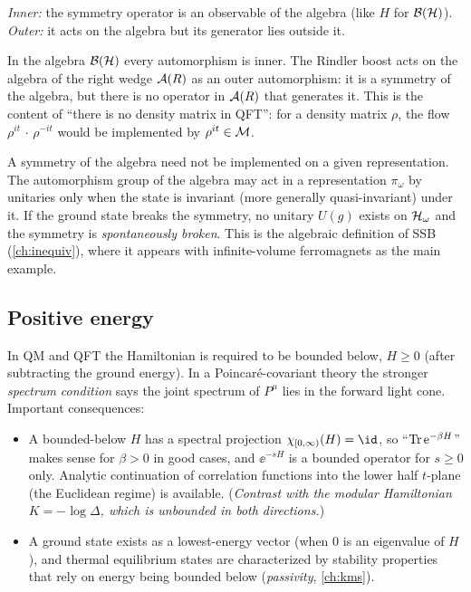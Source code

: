 \begin{center}
\emph{Inner:} the symmetry operator is an observable of the algebra (like $H$ for $\mathcal{B}(\mathcal{H})$).\\
\emph{Outer:} it acts on the algebra but its generator lies outside it.
\end{center}
In the algebra $\mathcal{B}(\mathcal{H})$ every automorphism is inner. The Rindler boost acts on the algebra of the right wedge $\mathcal{A}(R)$ as an outer automorphism: it is a symmetry of the algebra, but there is no operator in $\mathcal{A}(R)$ that generates it. This is the content of ``there is no density matrix in QFT'': for a density matrix $\rho$, the flow $\rho^{it}\,\cdot\,\rho^{-it}$ would be implemented by $\rho^{it}\in\mathcal{M}$.

\begin{whatwrong}
A symmetry of the algebra need not be implemented on a given representation. The automorphism group of the algebra may act in a representation $\pi_\omega$ by unitaries only when the state is invariant (more generally quasi-invariant) under it. If the ground state breaks the symmetry, no unitary $U(g)$ exists on $\mathcal{H}_\omega$ and the symmetry is \emph{spontaneously broken}. This is the algebraic definition of SSB (\cref{ch:inequiv}), where it appears with infinite-volume ferromagnets as the main example.
\end{whatwrong}

\subsection{Positive energy}

In QM and QFT the Hamiltonian is required to be bounded below, $H\ge0$ (after subtracting the ground energy). In a Poincar\'e-covariant theory the stronger \emph{spectrum condition} says the joint spectrum of $P^\mu$ lies in the forward light cone. Important consequences:
\begin{itemize}
\item A bounded-below $H$ has a spectral projection $\chi_{[0,\infty)}(H)=\id$, so ``$\operatorname{Tr}\mathrm{e}^{-\beta H}$'' makes sense for $\beta>0$ in good cases, and $\ee^{-sH}$ is a bounded operator for $s\ge0$ only. Analytic continuation of correlation functions into the lower half $t$-plane (the Euclidean regime) is available. (\emph{Contrast with the modular Hamiltonian $K=-\log\Delta$, which is \emph{unbounded in both directions}.})
\item A ground state exists as a lowest-energy vector (when $0$ is an eigenvalue of $H$), and thermal equilibrium states are characterized by stability properties that rely on energy being bounded below (\emph{passivity}, \cref{ch:kms}).
\end{itemize}

